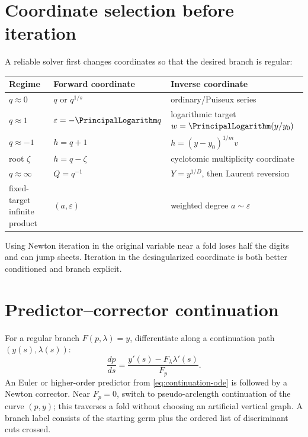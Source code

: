 \documentclass[11pt,letterpaper,oneside,openany]{book}
\theoremstyle{definition}
\theoremstyle{remark}
\begin{document}
\section{Coordinate selection before iteration}
A reliable solver first changes coordinates so that the desired branch is
regular:
\begin{center}
\begin{tabularx}{0.94\textwidth}{@{}lXX@{}}
\toprule
Regime & Forward coordinate & Inverse coordinate \\
\midrule
\(q\approx0\) & \(q\) or \(q^{1/s}\) & ordinary/Puiseux series \\
\(q\approx1\) & \(\varepsilon=-\PrincipalLogarithm q\) & logarithmic target \(w=\PrincipalLogarithm(y/y_0)\) \\
\(q\approx-1\) & \(h=q+1\) & \(h=(y-y_0)^{1/m}v\) \\
root \(\zeta\) & \(h=q-\zeta\) & cyclotomic multiplicity coordinate \\
\(q\approx\infty\) & \(Q=q^{-1}\) & \(Y=y^{1/D}\), then Laurent reversion \\
fixed-target infinite product & \((a,\varepsilon)\) & weighted degree \(a\sim\varepsilon\) \\
\bottomrule
\end{tabularx}
\end{center}
Using Newton iteration in the original variable near a fold loses half the
digits and can jump sheets.  Iteration in the desingularized coordinate is both
better conditioned and branch explicit.

\section{Predictor--corrector continuation}
For a regular branch \(F(p,\lambda)=y\), differentiate along a continuation
path \((y(s),\lambda(s))\):
\begin{equation}
 \frac{dp}{ds}=
 \frac{y'(s)-F_\lambda\lambda'(s)}{F_p}.
 \label{eq:continuation-ode}
\end{equation}
An Euler or higher-order predictor from \cref{eq:continuation-ode} is followed
by a Newton corrector.  Near \(F_p=0\), switch to pseudo-arclength continuation
of the curve \((p,y)\); this traverses a fold without choosing an artificial
vertical graph.  A branch label consists of the starting germ plus the ordered
list of discriminant cuts crossed.
\end{document}
